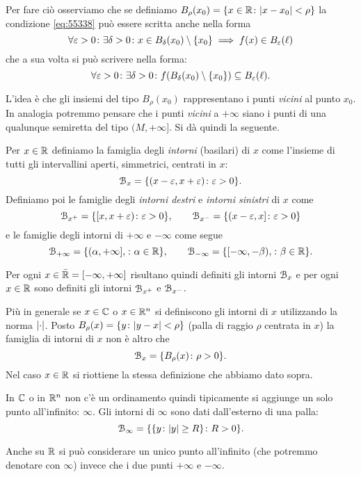 Per fare ciò osserviamo che
se definiamo%
$B_\rho(x_0) = {\left\{ x\in {\mathbb R} \colon {\left|x-x_0\right|}<\rho \right\}}$
la condizione \eqref{eq:55338}
può essere scritta anche nella forma 
\[
  \forall \varepsilon>0\colon \exists \delta >0 \colon 
  x \in B_\delta(x_0)\setminus{\left\{ x_0 \right\}} \implies f(x) \in B_\varepsilon(\ell)  
\]
che a sua volta si può scrivere nella forma:
\[
  \forall \varepsilon>0\colon \exists \delta >0 \colon 
  f(B_\delta(x_0)\setminus{\left\{ x_0 \right\}}) \subseteq  B_\varepsilon(\ell).    
\]

L'idea è che gli insiemi del tipo
$B_\rho(x_0)$ 
rappresentano i punti \emph{vicini} al punto $x_0$. 
In analogia potremmo pensare che i punti \emph{vicini} 
a $+\infty$ siano i punti di una qualunque semiretta 
del tipo $(M,+\infty]$.
Si dà quindi la seguente.


\begin{definition}[intorno]
Per $x\in {\mathbb R}$ definiamo la famiglia degli \emph{intorni}%
%
 (basilari) di $x$
come l'insieme di tutti gli intervallini aperti, simmetrici, centrati in $x$:
\[
  \mathcal B_x = {\left\{  (x-\varepsilon, x+\varepsilon) \colon \varepsilon>0 \right\}}.
\]
Definiamo poi le famiglie 
degli \emph{intorni destri} e \emph{intorni sinistri}
%
di $x$ come
\[
  \mathcal B_{x^+} = {\left\{  [x, x+\varepsilon) \colon \varepsilon>0 \right\}},
  \qquad
  \mathcal B_{x^-} = {\left\{  (x-\varepsilon , x] \colon \varepsilon>0 \right\}}
\]
e le famiglie degli intorni di $+\infty$ e $-\infty$ come segue
\[
  \mathcal B_{+\infty} = {\left\{  (\alpha,+\infty], \colon \alpha \in {\mathbb R}  \right\}},\qquad
  \mathcal B_{-\infty} = {\left\{  [-\infty, -\beta), \colon \beta\in {\mathbb R} \right\}}.
\]

Per ogni $x\in \bar {{\mathbb R}} = [-\infty, +\infty]$
risultano quindi definiti gli intorni $\mathcal B_x$ e per
ogni $x\in {\mathbb R}$ sono definiti gli intorni $\mathcal B_{x^+}$ e $\mathcal B_{x^-}$.

Più in generale se $x\in {\mathbb C}$ o $x\in {\mathbb R}^n$
si definiscono gli intorni di $x$ 
utilizzando la norma ${\left|\cdot\right|}$.
Posto $B_\rho(x) = {\left\{ y\colon {\left|y-x\right|}<\rho \right\}}$
(palla di raggio $\rho$ centrata in $x$)
la famiglia di intorni di $x$ non è altro che
\[
  \mathcal B_x = {\left\{ B_\rho(x)\colon \rho>0 \right\}}.
\]
Nel caso $x\in {\mathbb R}$ si riottiene la stessa definizione che 
abbiamo dato sopra.

In ${\mathbb C}$ o in ${\mathbb R}^n$ non c'è un ordinamento quindi 
tipicamente si aggiunge un solo punto all'infinito: $\infty$.
Gli intorni di $\infty$
sono dati dall'esterno di una palla:
\[
  \mathcal B_\infty = {\left\{ {\left\{ y\colon {\left|y\right|}\ge R \right\}}\colon R>0 \right\}}.
\]

Anche su ${\mathbb R}$ si può considerare un unico punto 
all'infinito (che potremmo denotare con $\infty$)
invece che i due punti $+\infty$ e $-\infty$.
\end{definition}

